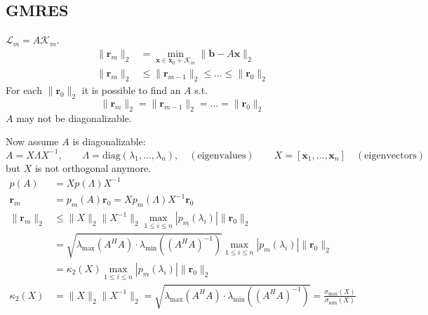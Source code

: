 \subsection{GMRES}
$\mathcal{L}_m = A\mathcal{K}_m$.
\begin{align*}
    \|\mathbf{r}_m\|_2 & = \min_{\mathbf{x} \in \mathbf{x}_0 + \mathcal{K}_m} \|\mathbf{b} - A\mathbf{x}\|_2 \\
    \|\mathbf{r}_m\|_2 & \leq \|\mathbf{r}_{m-1}\|_2 \leq \ldots \leq \|\mathbf{r}_0\|_2
\end{align*}
For each $\|\mathbf{r}_0\|_2$ it is possible to find an $A$ s.t.
\[
    \|\mathbf{r}_m\|_2 = \|\mathbf{r}_{m-1}\|_2 = \ldots = \|\mathbf{r}_0\|_2
\]
$A$ may not be diagonalizable.

Now assume $A$ is diagonalizable:
\[
    A = X\Lambda X^{-1}, \qquad \Lambda = \text{diag}(\lambda_1, \ldots, \lambda_n), \quad (\text{eigenvalues})
    \qquad X = [\mathbf{x}_1, \ldots, \mathbf{x}_n] \quad (\text{eigenvectors})
\]
but $X$ is not orthogonal anymore.
\begin{align*}
    p(A)               & = Xp(\Lambda)X^{-1}                                                                                                                 \\
    \mathbf{r}_m       & = p_m(A)\mathbf{r}_0 = Xp_m(\Lambda)X^{-1}\mathbf{r}_0                                                                              \\
    \|\mathbf{r}_m\|_2 & \leq \|X\|_2 \|X^{-1}\|_2 \max_{1 \leq i \leq n} |p_m(\lambda_i)| \|\mathbf{r}_0\|_2                                                \\
                       & = \sqrt{\lambda_{\max}(A^H A) \cdot \lambda_{\min}((A^H A)^{-1})} \max_{1 \leq i \leq n} |p_m(\lambda_i)| \|\mathbf{r}_0\|_2        \\
                       & = \kappa_2(X) \max_{1 \leq i \leq n} |p_m(\lambda_i)| \|\mathbf{r}_0\|_2                                                            \\
    \kappa_2(X)        & = \|X\|_2 \|X^{-1}\|_2 = \sqrt{\lambda_{\max}(A^H A)\cdot \lambda_{\min}((A^H A)^{-1})} = \frac{\sigma_{\max}(X)}{\sigma_{\min}(X)}
\end{align*}

